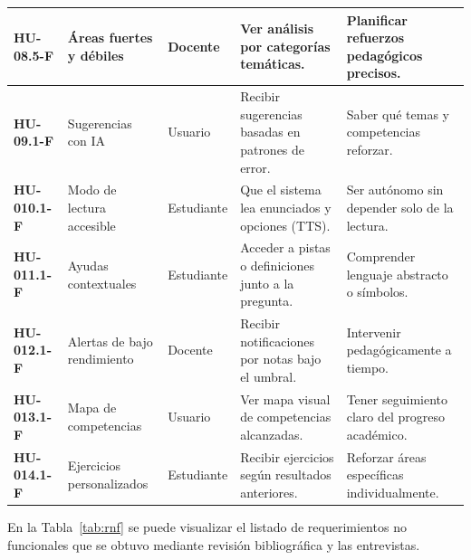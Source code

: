 \begin{small}
\begin{longtable}{|>{\bfseries}p{2.1cm}|p{3.2cm}|p{1.7cm}|p{4cm}|p{3.5cm}|}
HU-08.5-F & Áreas fuertes y débiles & Docente & Ver análisis por categorías temáticas. & Planificar refuerzos pedagógicos precisos. \\\hline
HU-09.1-F & Sugerencias con IA & Usuario & Recibir sugerencias basadas en patrones de error. & Saber qué temas y competencias reforzar. \\\hline
HU-010.1-F & Modo de lectura accesible & Estudiante & Que el sistema lea enunciados y opciones (TTS). & Ser autónomo sin depender solo de la lectura. \\\hline
HU-011.1-F & Ayudas contextuales & Estudiante & Acceder a pistas o definiciones junto a la pregunta. & Comprender lenguaje abstracto o símbolos. \\\hline
HU-012.1-F & Alertas de bajo rendimiento & Docente & Recibir notificaciones por notas bajo el umbral. & Intervenir pedagógicamente a tiempo. \\\hline
HU-013.1-F & Mapa de competencias & Usuario & Ver mapa visual de competencias alcanzadas. & Tener seguimiento claro del progreso académico. \\\hline
HU-014.1-F & Ejercicios personalizados & Estudiante & Recibir ejercicios según resultados anteriores. & Reforzar áreas específicas individualmente. \\\hline
\end{longtable}
\end{small}
\elaboracion

En la Tabla~\ref{tab:rnf} se puede visualizar el listado de requerimientos no funcionales que se obtuvo mediante revisión bibliográfica y las entrevistas.

